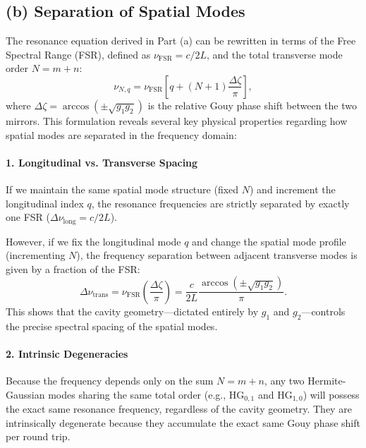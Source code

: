 \begin{resolucao}[Solution]
    \vspace{0.5cm}
    \subsection*{(b) Separation of Spatial Modes}
    
        The resonance equation derived in Part (a) can be rewritten in terms of the Free Spectral Range (FSR), defined as $\nu_{\mathrm{FSR}} = c/2L$, and the total transverse mode order $N = m+n$:
        \begin{equation}
            \nu_{N,q} = \nu_{\mathrm{FSR}} \left[ q + (N+1)\frac{\Delta\zeta}{\pi} \right],
        \end{equation}
        where $\Delta\zeta = \arccos\left(\pm\sqrt{g_1 g_2}\right)$ is the relative Gouy phase shift between the two mirrors. This formulation reveals several key physical properties regarding how spatial modes are separated in the frequency domain:
    
        \paragraph*{1. Longitudinal vs. Transverse Spacing}
            If we maintain the same spatial mode structure (fixed $N$) and increment the longitudinal index $q$, the resonance frequencies are strictly separated by exactly one FSR ($\Delta\nu_{\mathrm{long}} = c/2L$). 
            
            However, if we fix the longitudinal mode $q$ and change the spatial mode profile (incrementing $N$), the frequency separation between adjacent transverse modes is given by a fraction of the FSR:
            \begin{equation}
                \Delta\nu_{\mathrm{trans}} = \nu_{\mathrm{FSR}} \left( \frac{\Delta\zeta}{\pi} \right) = \frac{c}{2L} \frac{\arccos\left(\pm\sqrt{g_1 g_2}\right)}{\pi}.
            \end{equation}
            This shows that the cavity geometry—dictated entirely by $g_1$ and $g_2$—controls the precise spectral spacing of the spatial modes.
    
        \paragraph*{2. Intrinsic Degeneracies}
            Because the frequency depends only on the sum $N = m+n$, any two Hermite-Gaussian modes sharing the same total order (e.g., $\text{HG}_{0,1}$ and $\text{HG}_{1,0}$) will possess the exact same resonance frequency, regardless of the cavity geometry. They are intrinsically degenerate because they accumulate the exact same Gouy phase shift per round trip.
        

\end{resolucao}

